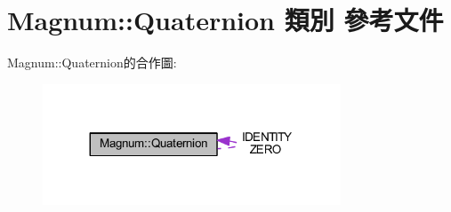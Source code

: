 \hypertarget{class_magnum_1_1_quaternion}{}\section{Magnum\+:\+:Quaternion 類別 參考文件}
\label{class_magnum_1_1_quaternion}


Magnum\+:\+:Quaternion的合作圖\+:\nopagebreak
\begin{figure}[H]
\begin{center}
\leavevmode
\includegraphics[width=251pt]{class_magnum_1_1_quaternion__coll__graph}
\end{center}
\end{figure}
